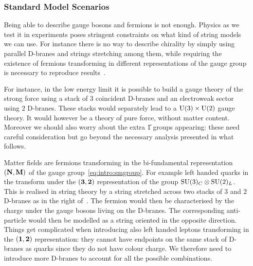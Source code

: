 \subsubsection{Standard Model Scenarios}

Being able to describe gauge bosons and fermions is not enough.
Physics as we test it in experiments poses stringent constraints on what kind of string models we can use.
For instance there is no way to describe chirality by simply using parallel D-branes and strings stretching among them, while requiring the existence of fermions transforming in different representations of the gauge group is necessary to reproduce \sm results~\cite{Ibanez:2012:StringTheoryParticle,Aldazabal:2000:DBranesSingularitiesBottomUp}.

For instance, in the low energy limit it is possible to build a gauge theory of the strong force using a stack of $3$ coincident D-branes and an electroweak sector using $2$ D-branes.
These stacks would separately lead to a $\mathrm{U}(3) \times \mathrm{U}(2)$ gauge theory.
It would however be a theory of pure force, without matter content.
Moreover we should also worry about the extra \U{1} groups appearing: these need careful consideration but go beyond the necessary analysis presented in what follows.

Matter fields are fermions transforming in the bi-fundamental representation $\qty(\vb{N}, \vb{M})$ of the \sm gauge group~\eqref{eq:intro:smgroup}.
For example left handed quarks in the \sm transform under the $\qty(\vb{3}, \vb{2})$ representation of the group $\mathrm{SU}(3)_C \otimes \mathrm{SU}(2)_L$.
This is realised in string theory by a string stretched across two stacks of $3$ and $2$ D-branes as in the right of~.
The fermion would then be characterised by the charge under the gauge bosons living on the D-branes.
The corresponding anti-particle would then be modelled as a string oriented in the opposite direction.
Things get complicated when introducing also left handed leptons transforming in the $\qty(\vb{1}, \vb{2})$ representation: they cannot have endpoints on the same stack of D-branes as quarks since they do not have colour charge.
We therefore need to introduce more D-branes to account for all the possible combinations.

